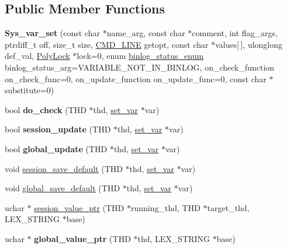\subsection*{Public Member Functions}
\begin{DoxyCompactItemize}
\item 
\mbox{\label{classSys__var__set_a9d89ee12091b70ff4a708ca2ddd060c9}} 
{\bfseries Sys\+\_\+var\+\_\+set} (const char $\ast$name\+\_\+arg, const char $\ast$comment, int flag\+\_\+args, ptrdiff\+\_\+t off, size\+\_\+t size, \mbox{\hyperlink{structCMD__LINE}{C\+M\+D\+\_\+\+L\+I\+NE}} getopt, const char $\ast$values\mbox{[}$\,$\mbox{]}, ulonglong def\+\_\+val, \mbox{\hyperlink{classPolyLock}{Poly\+Lock}} $\ast$lock=0, enum \mbox{\hyperlink{classsys__var_a664520ec82191888717c86085bfa83ce}{binlog\+\_\+status\+\_\+enum}} binlog\+\_\+status\+\_\+arg=V\+A\+R\+I\+A\+B\+L\+E\+\_\+\+N\+O\+T\+\_\+\+I\+N\+\_\+\+B\+I\+N\+L\+OG, on\+\_\+check\+\_\+function on\+\_\+check\+\_\+func=0, on\+\_\+update\+\_\+function on\+\_\+update\+\_\+func=0, const char $\ast$substitute=0)
\item 
\mbox{\label{classSys__var__set_af3406a395511ef979fc8013cca33c19d}} 
bool {\bfseries do\+\_\+check} (T\+HD $\ast$thd, \mbox{\hyperlink{classset__var}{set\+\_\+var}} $\ast$var)
\item 
\mbox{\label{classSys__var__set_a13f014484d073eda50b990b2355964c5}} 
bool {\bfseries session\+\_\+update} (T\+HD $\ast$thd, \mbox{\hyperlink{classset__var}{set\+\_\+var}} $\ast$var)
\item 
\mbox{\label{classSys__var__set_a3069a6748ac6902e30f5519681437923}} 
bool {\bfseries global\+\_\+update} (T\+HD $\ast$thd, \mbox{\hyperlink{classset__var}{set\+\_\+var}} $\ast$var)
\item 
void \mbox{\hyperlink{classSys__var__set_a810f24aa8b5a4b114b1ad71fceaebbd1}{session\+\_\+save\+\_\+default}} (T\+HD $\ast$thd, \mbox{\hyperlink{classset__var}{set\+\_\+var}} $\ast$var)
\item 
void \mbox{\hyperlink{classSys__var__set_a4992f46b91be120dd3a574950870d1fb}{global\+\_\+save\+\_\+default}} (T\+HD $\ast$thd, \mbox{\hyperlink{classset__var}{set\+\_\+var}} $\ast$var)
\item 
uchar $\ast$ \mbox{\hyperlink{classSys__var__set_af0c3fc1d38b4e098896935aa29d35a3a}{session\+\_\+value\+\_\+ptr}} (T\+HD $\ast$running\+\_\+thd, T\+HD $\ast$target\+\_\+thd, L\+E\+X\+\_\+\+S\+T\+R\+I\+NG $\ast$base)
\item 
\mbox{\label{classSys__var__set_aa8a684db1f5fd20d72492d0f6ace80fe}} 
uchar $\ast$ {\bfseries global\+\_\+value\+\_\+ptr} (T\+HD $\ast$thd, L\+E\+X\+\_\+\+S\+T\+R\+I\+NG $\ast$base)
\end{DoxyCompactItemize}
